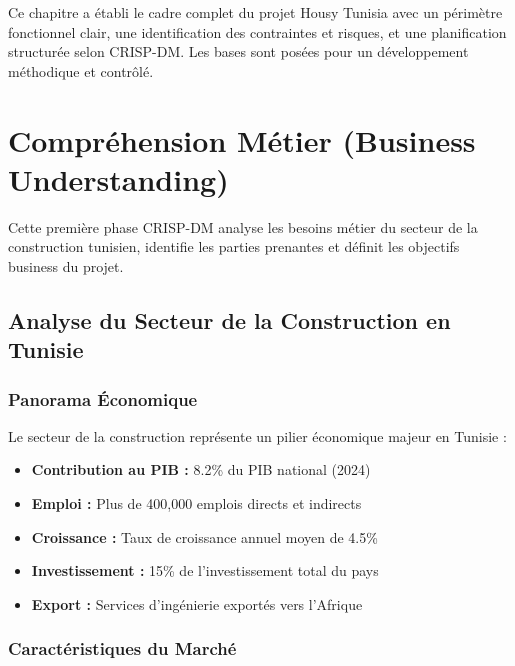 \documentclass[12pt, a4paper]{report}
\begin{document}
\begin{resultbox}
Ce chapitre a établi le cadre complet du projet Housy Tunisia avec un périmètre fonctionnel clair, une identification des contraintes et risques, et une planification structurée selon CRISP-DM. Les bases sont posées pour un développement méthodique et contrôlé.
\end{resultbox}

\chapter{Compréhension Métier (Business Understanding)}

\begin{objectivebox}
Cette première phase CRISP-DM analyse les besoins métier du secteur de la construction tunisien, identifie les parties prenantes et définit les objectifs business du projet.
\end{objectivebox}

\section{Analyse du Secteur de la Construction en Tunisie}

\subsection{Panorama Économique}

Le secteur de la construction représente un pilier économique majeur en Tunisie :

\begin{itemize}
    \item \textbf{Contribution au PIB :} 8.2\% du PIB national (2024)
    \item \textbf{Emploi :} Plus de 400,000 emplois directs et indirects
    \item \textbf{Croissance :} Taux de croissance annuel moyen de 4.5\%
    \item \textbf{Investissement :} 15\% de l'investissement total du pays
    \item \textbf{Export :} Services d'ingénierie exportés vers l'Afrique
\end{itemize}

\subsection{Caractéristiques du Marché}
\end{document}
